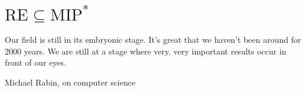 \section{$\text{RE} \subseteq \text{MIP}^*$}
\epigraph{Our field is still in its embryonic stage. It's great that we haven't been around
for 2000 years. We are still at a stage where very, very important results occur
in front of our eyes.}{Michael Rabin, on computer science}
 